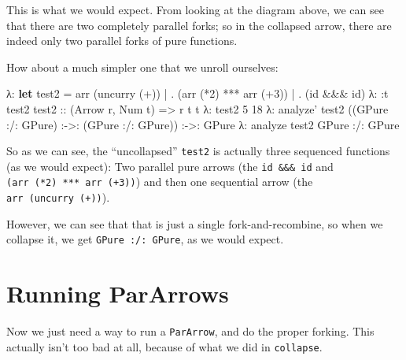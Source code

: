 \documentclass[]{article}
\newenvironment{Shaded}{}{}
\newcommand{\KeywordTok}[1]{\textcolor[rgb]{0.00,0.44,0.13}{\textbf{{#1}}}}
\newcommand{\DataTypeTok}[1]{\textcolor[rgb]{0.56,0.13,0.00}{{#1}}}
\newcommand{\DecValTok}[1]{\textcolor[rgb]{0.25,0.63,0.44}{{#1}}}
\newcommand{\OtherTok}[1]{\textcolor[rgb]{0.00,0.44,0.13}{{#1}}}
\newcommand{\FunctionTok}[1]{\textcolor[rgb]{0.02,0.16,0.49}{{#1}}}
\newcommand{\NormalTok}[1]{{#1}}
\begin{document}
This is what we would expect. From looking at the diagram above, we can see that
there are two completely parallel forks; so in the collapsed arrow, there are
indeed only two parallel forks of pure functions.

How about a much simpler one that we unroll ourselves:

\begin{Shaded}
\begin{Highlighting}[]
\NormalTok{λ}\FunctionTok{:} \KeywordTok{let} \NormalTok{test2 }\FunctionTok{=} \NormalTok{arr (uncurry (}\FunctionTok{+}\NormalTok{))}
 \FunctionTok{|}           \FunctionTok{.} \NormalTok{(arr (}\FunctionTok{*}\DecValTok{2}\NormalTok{) }\FunctionTok{***} \NormalTok{arr (}\FunctionTok{+}\DecValTok{3}\NormalTok{))}
 \FunctionTok{|}           \FunctionTok{.} \NormalTok{(id }\FunctionTok{&&&} \NormalTok{id)}
\NormalTok{λ}\FunctionTok{:} \FunctionTok{:}\NormalTok{t test2}
\OtherTok{test2 ::} \NormalTok{(}\DataTypeTok{Arrow} \NormalTok{r, }\DataTypeTok{Num} \NormalTok{t) }\OtherTok{=>} \NormalTok{r t t}
\NormalTok{λ}\FunctionTok{:} \NormalTok{test2 }\DecValTok{5}
\DecValTok{18}
\NormalTok{λ}\FunctionTok{:} \NormalTok{analyze' test2}
\NormalTok{((}\DataTypeTok{GPure} \FunctionTok{:/:} \DataTypeTok{GPure}\NormalTok{) }\FunctionTok{:->:} \NormalTok{(}\DataTypeTok{GPure} \FunctionTok{:/:} \DataTypeTok{GPure}\NormalTok{)) }\FunctionTok{:->:} \DataTypeTok{GPure}
\NormalTok{λ}\FunctionTok{:} \NormalTok{analyze test2}
\DataTypeTok{GPure} \FunctionTok{:/:} \DataTypeTok{GPure}
\end{Highlighting}
\end{Shaded}

So as we can see, the ``uncollapsed'' \texttt{test2} is actually three sequenced
functions (as we would expect): Two parallel pure arrows (the
\texttt{id\ \&\&\&\ id} and \texttt{(arr\ (*2)\ ***\ arr\ (+3))}) and then one
sequential arrow (the \texttt{arr\ (uncurry\ (+))}).

However, we can see that that is just a single fork-and-recombine, so when we
collapse it, we get \texttt{GPure\ :/:\ GPure}, as we would expect.

\section{Running ParArrows}\label{running-pararrows}

Now we just need a way to run a \texttt{ParArrow}, and do the proper forking.
This actually isn't too bad at all, because of what we did in \texttt{collapse}.
\end{document}
